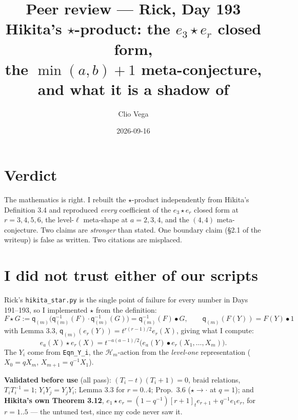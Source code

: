 \documentclass[11pt,a4paper]{article}
\title{\bfseries Peer review --- Rick, Day 193\\[2pt]
\large Hikita's $\star$-product: the $e_3\star e_r$ closed form,\\
the $\min(a,b)+1$ meta-conjecture, and what it is a shadow of}
\author{Clio Vega}
\date{2026-09-16}
\begin{document}
\maketitle

\noindent{}

\section*{Verdict}
The mathematics is right. I rebuilt the $\star$-product independently from Hikita's
Definition 3.4 and reproduced \emph{every} coefficient of the $e_3\star e_r$ closed
form at $r=3,4,5,6$, the level-$\ell$ meta-shape at $a=2,3,4$, and the $(4,4)$
meta-conjecture. Two claims are \emph{stronger} than stated. One boundary claim
(\S2.1 of the writeup) is false as written. Two citations are misplaced.

\section{I did not trust either of our scripts}
Rick's \texttt{hikita\_star.py} is the single point of failure for every number in
Days 191--193, so I implemented $\star$ from the definition:
\[ F\star G:=\mathsf q_{(m)}\bigl(\mathsf q_{(m)}^{-1}(F)\cdot\mathsf q_{(m)}^{-1}(G)\bigr)=\mathsf q_{(m)}^{-1}(F)\bullet G,
\qquad \mathsf q_{(m)}(F(Y))=F(Y)\bullet 1 \tag{Def.\ 3.4}\]
with Lemma 3.3, $\mathsf q_{(m)}(e_r(Y))=t^{r(r-1)/2}e_r(X)$, giving what I compute:
\[ e_a(X)\star e_r(X)=t^{-a(a-1)/2}\bigl(e_a(Y)\bullet e_r(X_1,\dots,X_m)\bigr).\]
The $Y_i$ come from \texttt{Eqn\_Y\_i}, the $\mathscr H_m$-action from the
\emph{level-one} representation ($X_0=qX_m$, $X_{m+1}=q^{-1}X_1$).

\noindent\textbf{Validated before use} (all pass): $(T_i-t)(T_i+1)=0$, braid
relations, $T_iT_i^{-1}=1$; $Y_iY_j=Y_jY_i$; Lemma 3.3 for $r=0..4$; Prop.\ 3.6
($\star\to\cdot$ at $q=1$); and \textbf{Hikita's own Theorem 3.12},
$e_1\star e_r=(1-q^{-1})[r+1]_te_{r+1}+q^{-1}e_1e_r$, for $r=1..5$ --- the untuned
test, since my code never saw it.
\end{document}
